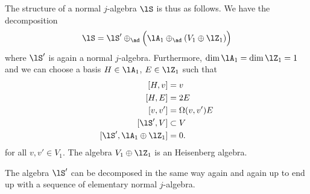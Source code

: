 The structure of a normal $j$-algebra $\lS$ is thus as follows. We have the decomposition
\begin{equation}
    \lS=\lS'\oplus_{\ad}\Big( \lA_1\oplus_{\ad}(V_1\oplus\lZ_1) \Big)
\end{equation}
where $\lS'$ is again a normal $j$-algebra. Furthermore, $\dim\lA_1=\dim\lZ_1=1$ and we can choose a basis $H\in\lA_1$, $E\in\lZ_1$ such that
\begin{equation}
    \begin{aligned}[]
        [H,v]&=v\\
        [H,E]&=2E\\
        [v,v']&=\Omega(v,v')E\\
        [\lS',V]&\subset V\\
        [\lS',\lA_1\oplus\lZ_1]&=0.
    \end{aligned}
\end{equation}
for all $v,v'\in V_1$. The algebra $V_1\oplus\lZ_1$ is an Heisenberg algebra.

The algebra $\lS'$ can be decomposed in the same way again and again up to end up with a sequence of elementary normal $j$-algebra.

